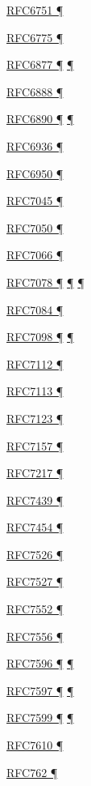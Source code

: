 \documentclass[
]{article}
\begin{document}
\hyperref[obsolete-techniques]{RFC6751 ¶}

\hyperref[address-resolution]{RFC6775 ¶}

\hyperref[dual-stack-scenarios]{RFC6877 ¶}
\hyperref[translation-and-ipv4-as-a-service]{¶}

\hyperref[dual-stack-scenarios]{RFC6888 ¶}

\hyperref[addresses]{RFC6890 ¶} \hyperref[filtering]{¶}

\hyperref[transport-protocols]{RFC6936 ¶}

\hyperref[multi-prefix-operation]{RFC6950 ¶}

\hyperref[filtering]{RFC7045 ¶}

\hyperref[obsolete-techniques]{RFC7050 ¶}

\hyperref[managed-configuration]{RFC7066 ¶}

\hyperref[dns]{RFC7078 ¶}
\hyperref[source-and-destination-address-selection]{¶}
\hyperref[multi-prefix-operation]{¶}

\hyperref[routing]{RFC7084 ¶}

\hyperref[traffic-class-and-flow-label]{RFC7098 ¶}
\hyperref[topology-obfuscation]{¶}

\hyperref[layer-2-considerations]{RFC7112 ¶}

\hyperref[layer-2-considerations]{RFC7113 ¶}

\hyperref[filtering]{RFC7123 ¶}

\hyperref[multihoming]{RFC7157 ¶}

\hyperref[security-operation]{RFC7217 ¶}

\hyperref[tunnels]{RFC7439 ¶}

\hyperref[filtering]{RFC7454 ¶}

\hyperref[obsolete-techniques]{RFC7526 ¶}

\hyperref[auto-configuration]{RFC7527 ¶}

\hyperref[tunnels]{RFC7552 ¶}

\hyperref[multihoming]{RFC7556 ¶}

\hyperref[dual-stack-scenarios]{RFC7596 ¶}
\hyperref[translation-and-ipv4-as-a-service]{¶}

\hyperref[dual-stack-scenarios]{RFC7597 ¶}
\hyperref[translation-and-ipv4-as-a-service]{¶}

\hyperref[dual-stack-scenarios]{RFC7599 ¶}
\hyperref[translation-and-ipv4-as-a-service]{¶}

\hyperref[layer-2-considerations]{RFC7610 ¶}

\hyperref[why-version-6]{RFC762 ¶}
\end{document}
